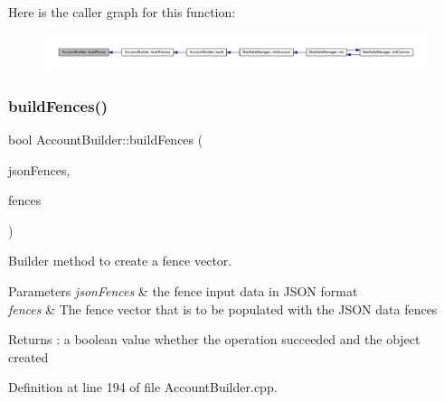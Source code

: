 Here is the caller graph for this function\+:\nopagebreak
\begin{figure}[H]
\begin{center}
\leavevmode
\includegraphics[width=350pt]{d9/daa/class_account_builder_ac5801a1130d7a1f84a66c45cfd6e0a8d_icgraph}
\end{center}
\end{figure}
\mbox{\label{class_account_builder_a1992add0c2ab404664d4cbae326c6ec7}} 
\subsubsection{\texorpdfstring{build\+Fences()}{buildFences()}}
{\footnotesize\ttfamily bool Account\+Builder\+::build\+Fences (\begin{DoxyParamCaption}\item[{const web\+::json\+::array \&}]{json\+Fences,  }\item[{std\+::vector$<$ \hyperlink{class_fence}{Fence} $\ast$$>$ \&}]{fences }\end{DoxyParamCaption})\hspace{0.3cm}{\ttfamily [private]}}

Builder method to create a fence vector.


\begin{DoxyParams}{Parameters}
{\em json\+Fences} & the fence input data in J\+S\+ON format \\
\hline
{\em fences} & The fence vector that is to be populated with the J\+S\+ON data fences \\
\hline
\end{DoxyParams}
\begin{DoxyReturn}{Returns}
\+: a boolean value whether the operation succeeded and the object created 
\end{DoxyReturn}


Definition at line 194 of file Account\+Builder.\+cpp.


